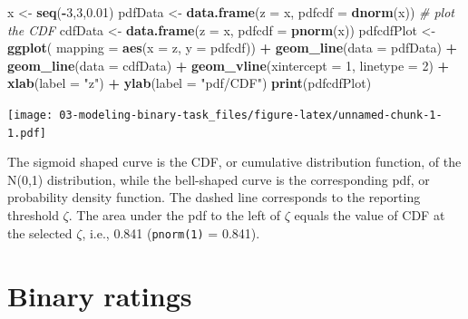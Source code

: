 \documentclass[
]{book}
\newenvironment{Shaded}{\begin{snugshade}}{\end{snugshade}}
\newcommand{\CommentTok}[1]{\textcolor[rgb]{0.56,0.35,0.01}{\textit{#1}}}
\newcommand{\DataTypeTok}[1]{\textcolor[rgb]{0.13,0.29,0.53}{#1}}
\newcommand{\DecValTok}[1]{\textcolor[rgb]{0.00,0.00,0.81}{#1}}
\newcommand{\FloatTok}[1]{\textcolor[rgb]{0.00,0.00,0.81}{#1}}
\newcommand{\KeywordTok}[1]{\textcolor[rgb]{0.13,0.29,0.53}{\textbf{#1}}}
\newcommand{\NormalTok}[1]{#1}
\newcommand{\OperatorTok}[1]{\textcolor[rgb]{0.81,0.36,0.00}{\textbf{#1}}}
\newcommand{\StringTok}[1]{\textcolor[rgb]{0.31,0.60,0.02}{#1}}
\begin{document}
\begin{Shaded}
\begin{Highlighting}[]
\NormalTok{x \textless{}{-}}\StringTok{ }\KeywordTok{seq}\NormalTok{(}\OperatorTok{{-}}\DecValTok{3}\NormalTok{,}\DecValTok{3}\NormalTok{,}\FloatTok{0.01}\NormalTok{)}
\NormalTok{pdfData \textless{}{-}}\StringTok{ }\KeywordTok{data.frame}\NormalTok{(}\DataTypeTok{z =}\NormalTok{ x, }\DataTypeTok{pdfcdf =} \KeywordTok{dnorm}\NormalTok{(x))}
\CommentTok{\# plot the CDF}
\NormalTok{cdfData \textless{}{-}}\StringTok{ }\KeywordTok{data.frame}\NormalTok{(}\DataTypeTok{z =}\NormalTok{ x, }\DataTypeTok{pdfcdf =} \KeywordTok{pnorm}\NormalTok{(x))}
\NormalTok{pdfcdfPlot \textless{}{-}}\StringTok{ }\KeywordTok{ggplot}\NormalTok{(}
  \DataTypeTok{mapping =} \KeywordTok{aes}\NormalTok{(}\DataTypeTok{x =}\NormalTok{ z, }\DataTypeTok{y =}\NormalTok{ pdfcdf)) }\OperatorTok{+}\StringTok{ }
\StringTok{  }\KeywordTok{geom\_line}\NormalTok{(}\DataTypeTok{data =}\NormalTok{ pdfData) }\OperatorTok{+}\StringTok{ }
\StringTok{  }\KeywordTok{geom\_line}\NormalTok{(}\DataTypeTok{data =}\NormalTok{ cdfData) }\OperatorTok{+}
\StringTok{  }\KeywordTok{geom\_vline}\NormalTok{(}\DataTypeTok{xintercept =} \DecValTok{1}\NormalTok{, }\DataTypeTok{linetype =} \DecValTok{2}\NormalTok{) }\OperatorTok{+}\StringTok{ }
\StringTok{  }\KeywordTok{xlab}\NormalTok{(}\DataTypeTok{label =} \StringTok{"z"}\NormalTok{) }\OperatorTok{+}\StringTok{ }\KeywordTok{ylab}\NormalTok{(}\DataTypeTok{label =} \StringTok{"pdf/CDF"}\NormalTok{)}
\KeywordTok{print}\NormalTok{(pdfcdfPlot)}
\end{Highlighting}
\end{Shaded}

\texttt{[image: 03-modeling-binary-task\_files/figure-latex/unnamed-chunk-1-1.pdf]}

The sigmoid shaped curve is the CDF, or cumulative distribution function, of the N(0,1) distribution, while the bell-shaped curve is the corresponding pdf, or probability density function. The dashed line corresponds to the reporting threshold \(\zeta\). The area under the pdf to the left of \(\zeta\) equals the value of CDF at the selected \(\zeta\), i.e., 0.841 (\texttt{pnorm(1)} = 0.841).

\hypertarget{binary-ratings}{%
\section{Binary ratings}\label{binary-ratings}}
\end{document}
